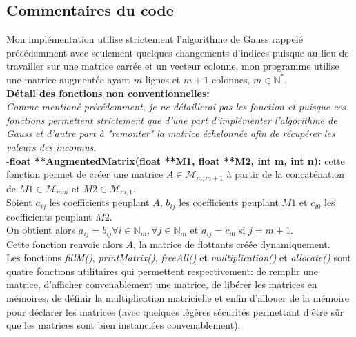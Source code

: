 \subsection{Commentaires du code}
Mon implémentation utilise strictement l'algorithme de Gauss rappelé précédemment avec seulement quelques changements d'indices puisque au lieu de travailler sur une matrice carrée et un vecteur colonne, mon programme utilise une matrice augmentée ayant $m$ lignes et $m+1$ colonnes, $m\in \mathbb{N}^*$. \\
\textbf{Détail des fonctions non conventionnelles:}\\
\textit{Comme mentioné précédemment, je ne détaillerai pas les fonction  et  puisque ces fonctions permettent strictement que d'une part d'implémenter l'algorithme de Gauss et d'autre part à "remonter" la matrice échelonnée afin de récupérer les valeurs des inconnus}. \\
-\textbf{float **AugmentedMatrix(float **M1, float **M2, int m, int n):} cette fonction permet de créer une matrice $A \in \mathcal{M}_{m,m+1}$ à partir de la concaténation de $M1 \in \mathcal{M}_{mm}$ et $M2 \in \mathcal{M}_{m,1}$. \\
Soient $a_{ij}$ les coefficients peuplant $A$, $b_{ij}$ les coefficients peuplant $M1$ et $c_{i0}$ les coefficients peuplant $M2$. \\
On obtient alors $a_{ij} = b_{ij} \forall i \in \mathbb{N}_{m}, \forall j \in \mathbb{N}_{m}$ et $a_{ij} = c_{i0}$ si $j = m+1$. \\
Cette fonction renvoie alors $A$, la matrice de flottants créée dynamiquement. \\
Les fonctions \textit{fillM()}, \textit{printMatrix()}, \textit{freeAll()} et \textit{multiplication()} et \textit{allocate()} sont quatre fonctions utilitaires qui permettent respectivement: de remplir une matrice, d'afficher convenablement une matrice, de libérer les matrices en mémoires, de définir la multiplication matricielle et enfin d'allouer de la mémoire pour déclarer les matrices (avec quelques légères sécurités permettant d'être sûr que les matrices sont bien instanciées convenablement). 
